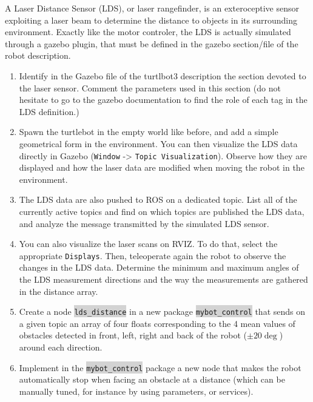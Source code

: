 \documentclass[10pt,a4paper]{upmc}
\newcounter{mainmemorder}
\newcommand{\save}{\setcounter{mainmemorder}{\value{enumi}}}
\newcommand{\load}{\setcounter{enumi}{\value{mainmemorder}}}
\newcommand{\mytext}[1]{\colorbox{lightgray}{\texttt{#1}}}
\begin{document}
A Laser Distance Sensor (LDS), or laser rangefinder, is an exteroceptive sensor exploiting a laser
beam to determine the distance to objects in its surrounding environment. Exactly like the motor
controler, the LDS is actually simulated through a gazebo plugin, that must be defined in the
gazebo section/file of the robot description.
%
\begin{enumerate}
  \load
  \item Identify in the Gazebo file of the turtlbot3 description the section devoted to the laser
        sensor. Comment the parameters used in this section (do not hesitate to go to the gazebo
        documentation to find the role of each tag in the LDS definition.)
  \item Spawn the turtlebot in the empty world like before, and add a simple geometrical form in the
        environment. You can then visualize the LDS data directly in Gazebo (\texttt{Window} ->
        \texttt{Topic Visualization}). Observe how they are displayed and how the laser data are modified
        when moving the robot in the environment.
  \item The LDS data are also pushed to ROS on a dedicated topic. List all of the currently active
        topics and find on which topics are published the LDS data, and analyze the message transmitted by
        the simulated LDS sensor.

  \item You can also visualize the laser scans on RVIZ. To do that, select the appropriate
        \texttt{Displays}. Then, teleoperate again the robot to observe the changes in the LDS data.
        Determine the minimum and maximum angles of the LDS measurement directions and the way the
        measurements are gathered in the distance array.

  \item Create a node \mytext{lds\_distance} in a new package \mytext{mybot\_control} that sends on a
        given topic an array of four floats corresponding to the 4 mean values of obstacles detected
        in front, left, right and back of the robot ($\pm 20\deg$) around each direction.

  \item Implement in the \mytext{mybot\_control} package a new node that makes the robot
        automatically stop when facing an obstacle at a distance (which can be manually tuned, for
        instance by using parameters, or services).
    \save
\end{enumerate}
\end{document}

